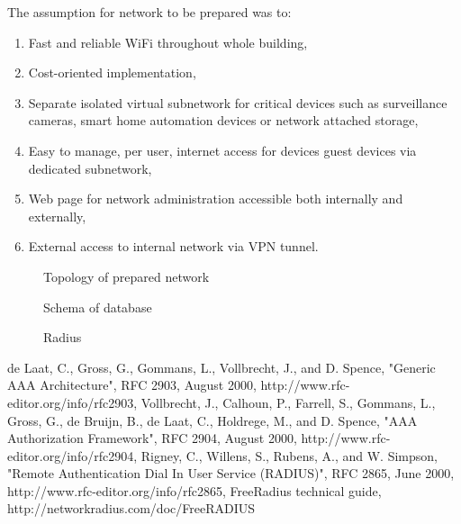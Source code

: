 \documentclass{llncs}
\begin{document}
The assumption for network to be prepared was to:
\begin{enumerate}
  \item Fast and reliable WiFi throughout whole building,
  \item Cost-oriented implementation,
  \item Separate isolated virtual subnetwork for critical devices
such as surveillance cameras, smart home automation devices or network attached
storage,
  \item Easy to manage, per user, internet access for devices guest devices via
  dedicated subnetwork,
  \item Web page for network administration accessible both internally and
  externally,
  \item External access to internal network via VPN tunnel.
\end{enumerate}


\begin{figure}
\vspace{-15pt}
\caption{Topology of prepared network}
\end{figure}

\begin{figure}
\vspace{-15pt}
\caption{Schema of database}
\end{figure}

\begin{figure}
\vspace{-15pt}
\caption{Radius}
\end{figure}

%
%
\begin{thebibliography}{}
%
de Laat, C., Gross, G., Gommans, L., Vollbrecht, J., and D. Spence, "Generic AAA
Architecture", RFC 2903, August 2000, http://www.rfc-editor.org/info/rfc2903,
Vollbrecht, J., Calhoun, P., Farrell, S., Gommans, L., Gross, G., de Bruijn, B.,
de Laat, C., Holdrege, M., and D. Spence, "AAA Authorization Framework", RFC
2904, August 2000, http://www.rfc-editor.org/info/rfc2904,
Rigney, C., Willens, S., Rubens, A., and W. Simpson, "Remote  Authentication
Dial In User Service (RADIUS)", RFC 2865, June 2000,
http://www.rfc-editor.org/info/rfc2865,
FreeRadius technical guide,
http://networkradius.com/doc/FreeRADIUS%
\end{thebibliography}



\clearpage
{} %
\renewcommand{\indexname}{Author Index}
\printindex
\clearpage
{} %
\renewcommand{\indexname}{Subject Index}

\end{document}
